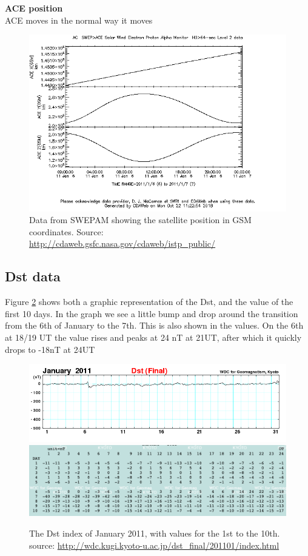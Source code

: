 \documentclass[norsk,a4paper,12pt]{article}
\begin{document}
\begin{multicols}{2}
\textbf{ACE position}\\
ACE moves in the normal way it moves
\begin{figure}[H]
	\includegraphics[scale=0.4]{Figures/ACE_positionGSM.png}
	\centering
	\caption{Data from SWEPAM showing the satellite position in GSM coordinates. Source: \url{http://cdaweb.gsfc.nasa.gov/cdaweb/istp_public/}}
	\label{fig:ACE_pos}
\end{figure}



\subsection{Dst data} %
\label{sub:dst_data}

Figure \ref{fig:Dst} shows both a graphic representation of the Dst, and the value of the first 10 days. In the graph we see a little bump and drop around the transition from the 6th of January to the 7th. This is also shown in the values. On the 6th at 18/19 UT the value rises and peaks at 24 nT at 21UT, after which it quickly drops to -18nT at 24UT
\begin{figure}[H]
	\includegraphics[scale=0.3]{Figures/dst1101.png}
	\includegraphics[scale=0.3]{Figures/dst_january.png}
	\centering
	\caption{The Dst index of January 2011, with values for the 1st to the 10th. source: \url{http://wdc.kugi.kyoto-u.ac.jp/dst_final/201101/index.html}}
	\label{fig:Dst}
\end{figure}


\end{multicols}
\end{document}
